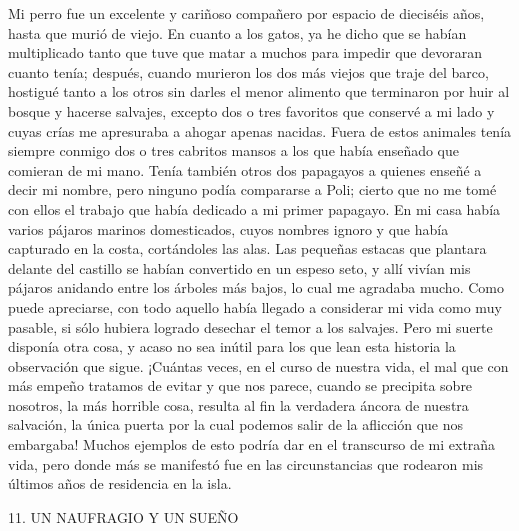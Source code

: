 \documentclass{novela}
\begin{document}
    Mi perro fue un excelente y cariñoso compañero por espacio de dieciséis años, hasta que murió de viejo. En cuanto a los gatos, ya he dicho que se habían multiplicado tanto que tuve que matar a muchos para impedir que devoraran cuanto tenía; después, cuando murieron los dos más viejos que traje del barco, hostigué tanto a los otros sin darles el menor alimento que terminaron por huir al bosque y hacerse salvajes, excepto dos o tres favoritos que conservé a mi lado y cuyas crías me apresuraba a ahogar apenas nacidas. Fuera de estos animales tenía siempre conmigo dos o tres cabritos mansos a los que había enseñado que comieran de mi mano. Tenía también otros dos papagayos a quienes enseñé a decir mi nombre, pero ninguno podía compararse a Poli; cierto que no me tomé con ellos el trabajo que había dedicado a mi primer papagayo. En mi casa había varios pájaros marinos domesticados, cuyos nombres ignoro y que había capturado en la costa, cortándoles las alas. Las pequeñas estacas que plantara delante del castillo se habían convertido en un espeso seto, y allí vivían mis pájaros anidando entre los árboles más bajos, lo cual me agradaba mucho. Como puede apreciarse, con todo aquello había llegado a considerar mi vida como muy pasable, si sólo hubiera logrado desechar el temor a los salvajes.
    Pero mi suerte disponía otra cosa, y acaso no sea inútil para los que lean esta historia la observación que sigue. ¡Cuántas veces, en el curso de nuestra vida, el mal que con más empeño tratamos de evitar y que nos parece, cuando se precipita sobre nosotros, la más horrible cosa, resulta al fin la verdadera áncora de nuestra salvación, la única puerta por la cual podemos salir de la aflicción que nos embargaba! Muchos ejemplos de esto podría dar en el transcurso de mi extraña vida, pero donde más se manifestó fue en las circunstancias que rodearon mis últimos años de residencia en la isla.





    11. UN NAUFRAGIO Y UN SUEÑO
\end{document}
